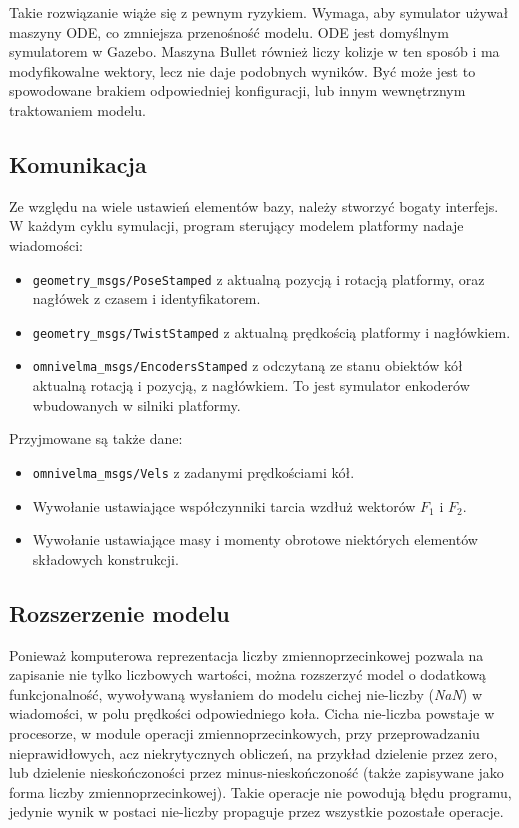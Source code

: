 		Takie rozwiązanie wiąże się z pewnym ryzykiem.
		Wymaga, aby symulator używał maszyny ODE, co zmniejsza przenośność modelu. ODE jest domyślnym symulatorem w Gazebo.
		Maszyna Bullet również liczy kolizje w ten sposób i ma modyfikowalne wektory, 
		lecz nie daje podobnych wyników. Być może jest to spowodowane brakiem odpowiedniej konfiguracji, lub innym wewnętrznym traktowaniem modelu.

	\subsection{Komunikacja}
		Ze względu na wiele ustawień elementów bazy, należy stworzyć bogaty interfejs.
		W każdym cyklu symulacji, program sterujący modelem platformy nadaje wiadomości:
		\begin{itemize}
		\item \texttt{geometry\_msgs/PoseStamped} z aktualną pozycją i rotacją platformy, oraz nagłówek z czasem i identyfikatorem.
		\item \texttt{geometry\_msgs/TwistStamped} z aktualną prędkością platformy i nagłówkiem.
		\item \texttt{omnivelma\_msgs/EncodersStamped} z odczytaną ze stanu obiektów kół aktualną rotacją i pozycją, z nagłówkiem. 
		To jest symulator enkoderów wbudowanych w silniki platformy.
		\end{itemize}
		
		Przyjmowane są także dane:
		\begin{itemize}
		\item \texttt{omnivelma\_msgs/Vels} z zadanymi prędkościami kół.
		\item Wywołanie ustawiające współczynniki tarcia wzdłuż wektorów $F_1$ i $F_2$.
		\item Wywołanie ustawiające masy i momenty obrotowe niektórych elementów składowych konstrukcji.
		\end{itemize}

	\subsection{Rozszerzenie modelu}
		\label{sec:model_nan}
		Ponieważ komputerowa reprezentacja liczby zmiennoprzecinkowej pozwala na zapisanie nie tylko liczbowych wartości, można rozszerzyć model o dodatkową funkcjonalność,
		wywoływaną wysłaniem do modelu cichej nie-liczby (\emph{NaN}) w wiadomości, w polu prędkości odpowiedniego koła. 
		Cicha nie-liczba powstaje w procesorze, w module operacji zmiennoprzecinkowych, przy przeprowadzaniu nieprawidłowych, 
		acz niekrytycznych obliczeń, na przykład dzielenie przez zero, lub dzielenie nieskończoności przez minus-nieskończoność 
		(także zapisywane jako forma liczby zmiennoprzecinkowej).
		Takie operacje nie powodują błędu programu, jedynie wynik w postaci nie-liczby propaguje przez wszystkie pozostałe operacje.

